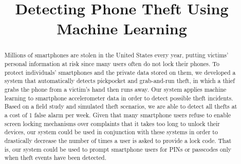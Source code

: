 \documentclass[sigconf, anonymous]{acmart}
\begin{document}
\title{Detecting Phone Theft Using Machine Learning} %

\begin{abstract}
Millions of smartphones are stolen in the United States every year, putting victims' personal information at risk since many users often do not lock their phones. 
To protect individuals' smartphones and the private data stored on them, we developed a system that automatically detects pickpocket and grab-and-run theft, in which a thief grabs the phone from a victim's hand then runs away. 
Our system applies machine learning to smartphone accelerometer data in order to detect possible theft incidents. Based on a field study and simulated theft scenarios, we are able to detect all thefts at a cost of 1 false alarm per week. Given that many smartphone users refuse to enable screen locking mechanisms over complaints that it takes too long to unlock their devices, our system could be used in conjunction with these systems in order to drastically decrease the number of times a user is asked to provide a lock code. That is, our system could be used to prompt smartphone users for PINs or passcodes only when theft events have been detected.
\end{abstract}




\maketitle




\end{document}
